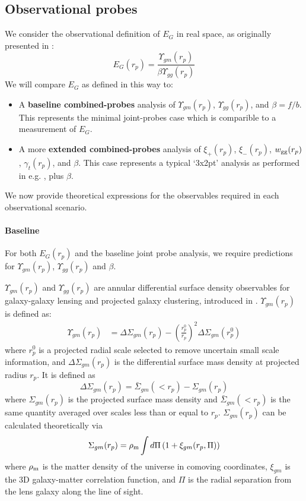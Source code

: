 \documentclass[onecolumn,amsmath,aps,fleqn, superscriptaddress]{revtex4}
\begin{document}
\subsection{Observational probes}
We consider the observational definition of $E_G$ in real space, as originally presented in \cite{Reyes2010}:
\begin{equation}
E_G(r_p) = \frac{\Upsilon_{gm}(r_p)}{\beta \Upsilon_{gg}(r_p)}
\label{egreyes}
\end{equation}
We will compare $E_G$ as defined in this way to:
\begin{itemize}
\item{A {\bf baseline combined-probes} analysis of $\Upsilon_{gm}(r_p)$, $\Upsilon_{gg}(r_p)$, and $\beta = f / b$. This represents the minimal joint-probes case which is comparible to a measurement of $E_G$.}
\item{A more {\bf extended combined-probes} analysis of $\xi_{+}(r_p)$, $\xi_{-}(r_p)$, $w_{\rm gg}(r_p)$, $\gamma_{t}(r_p)$, and $\beta$. This case represents a typical `3x2pt' analysis as performed in e.g. \cite{DESY1kp2017}, plus $\beta$.}
\end{itemize} 

We now provide theoretical expressions for the observables required in each observational scenario.
\paragraph*{Baseline}
For both $E_G(r_p)$ and the baseline joint probe analysis, we require predictions for $\Upsilon_{gm}(r_p)$, $\Upsilon_{gg}(r_p)$ and $\beta$. 

$\Upsilon_{gm}(r_p)$ and $\Upsilon_{gg}(r_p)$ are annular differential surface density observables for galaxy-galaxy lensing and projected galaxy clustering, introduced in \cite{Baldauf2010}. $\Upsilon_{gm}(r_p)$ is defined as:
\begin{align}
\Upsilon_{gm}(r_p) &= \Delta \Sigma_{gm}(r_p) - \left(\frac{r_p^0}{r_p}\right)^2 \Delta \Sigma_{gm}(r_p^0)
\label{upgm}
\end{align}
where $r_p^0$ is a projected radial scale selected to remove uncertain small scale information, and $\Delta \Sigma_{gm}(r_p)$ is the differential surface mass density at projected radius $r_p$. It is defined as
\begin{equation}
\Delta \Sigma_{gm}(r_p) = \bar{\Sigma}_{gm}(<r_p) - \Sigma_{gm}(r_p)
\label{DeltaSigma_literal}
\end{equation}
where $\Sigma_{gm}(r_p)$ is the projected surface mass density and $\bar{\Sigma}_{gm}(<r_p)$ is the same quantity averaged over scales less than or equal to $r_p$. $\Sigma_{gm}(r_p)$ can be calculated theoretically via
\begin{equation}
\Sigma_{gm}(r_p) = \rho_{\rm m} \int d \Pi \, (1 + \xi_{gm}(r_p, \Pi))
\label{Sigma_gm}
\end{equation}
where $\rho_{\rm m}$ is the matter density of the universe in comoving coordinates, $\xi_{gm}$ is the 3D galaxy-matter correlation function, and $\Pi$ is the radial separation from the lens galaxy along the line of sight. 
\end{document}
